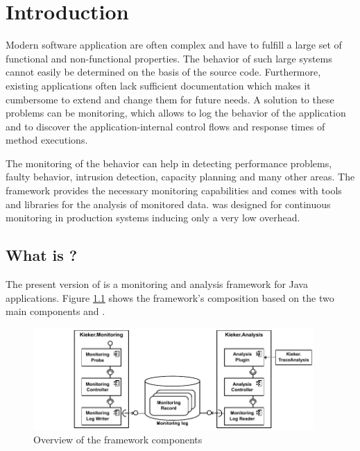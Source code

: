 % 


\chapter{Introduction}\label{chap:introduction}

Modern software application are often complex and have to fulfill a large set of functional and non-functional properties. The behavior of such large systems cannot easily be determined on the basis of the source code. Furthermore, existing applications often lack sufficient documentation which makes it cumbersome to extend and change them for future needs. A solution to these problems can be monitoring, which allows to log the behavior of the application and to discover the application-internal control flows and response times of method executions.

The monitoring of the behavior can help in detecting performance problems, faulty behavior, intrusion detection, capacity planning and many other areas. The \Kieker{} framework provides the necessary monitoring capabilities and comes with tools and libraries for the analysis of monitored data. \Kieker{} was designed for %
continuous monitoring in production systems inducing only a very low overhead. 

\section{What is \Kieker?}\label{sec:kieker}

The present version of \Kieker{} is a monitoring and analysis framework for Java applications. Figure \ref{fig:KiekerComponentDiagram} shows the framework's composition based on the two main components \KiekerMonitoringPart{} and \KiekerAnalysisPart{}. 

\begin{figure}[H]\centering
\includegraphics[width=0.95\textwidth]{images/kiekerComponentDiagram-woCloud-bw-w-record-newNames-withTraceAnalysis}
\caption{Overview of the framework components}
\label{fig:KiekerComponentDiagram}
\end{figure}
		
